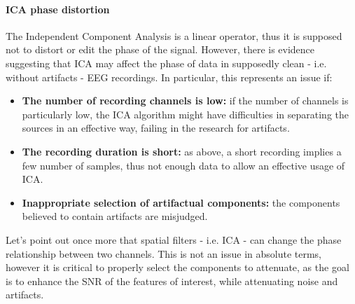 \paragraph{ICA phase distortion} The Independent Component Analysis is a linear operator, thus
it is supposed not to distort or edit the phase of the signal. However, there is evidence
suggesting that ICA may affect the phase of data in supposedly clean - i.e. without artifacts -
EEG recordings. In particular, this represents an issue if:
\begin{itemize}
    \item \textbf{The number of recording channels is low:} if the number of channels is particularly
          low, the ICA algorithm might have difficulties in separating the
          sources in an effective way, failing in the research for artifacts.
    \item \textbf{The recording duration is short:} as above, a short recording implies a few number
          of samples, thus not enough data to allow an effective usage of ICA.
    \item \textbf{Inappropriate selection of artifactual components:} the components believed to
          contain artifacts are misjudged.
\end{itemize}
Let's point out once more that spatial filters - i.e. ICA - can change the phase relationship
between two channels. This is not an issue in absolute terms, however it is critical to
properly select the components to attenuate, as the goal is to enhance the SNR of the features
of interest, while attenuating noise and artifacts.
